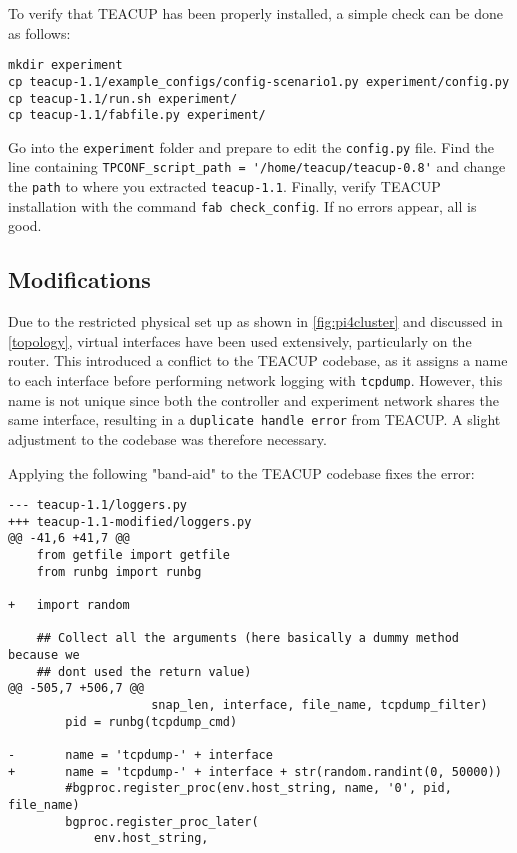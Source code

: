 To verify that TEACUP has been properly installed, a simple check can be done as follows:

\begin{verbatim}
mkdir experiment
cp teacup-1.1/example_configs/config-scenario1.py experiment/config.py
cp teacup-1.1/run.sh experiment/
cp teacup-1.1/fabfile.py experiment/
\end{verbatim}

Go into the \lstinline{experiment} folder and prepare to edit the \lstinline{config.py} file. Find the line containing \lstinline{TPCONF_script_path = '/home/teacup/teacup-0.8'} and change the \lstinline{path} to where you extracted \lstinline{teacup-1.1}. Finally, verify TEACUP installation with the command \lstinline{fab check_config}. If no errors appear, all is good.


\subsection{Modifications}

Due to the restricted physical set up as shown in \ref{fig:pi4cluster} and discussed in \ref{topology}, virtual interfaces have been used extensively, particularly on the router. This introduced a conflict to the TEACUP codebase, as it assigns a name to each interface before performing network logging with \lstinline{tcpdump}. However, this name is not unique since both the controller and experiment network shares the same interface, resulting in a \lstinline{duplicate handle error} from TEACUP. A slight adjustment to the codebase was therefore necessary.

Applying the following "band-aid" to the TEACUP codebase fixes the error:

\begin{verbatim}
--- teacup-1.1/loggers.py
+++ teacup-1.1-modified/loggers.py
@@ -41,6 +41,7 @@
    from getfile import getfile
    from runbg import runbg
    
+   import random
    
    ## Collect all the arguments (here basically a dummy method because we
    ## dont used the return value)
@@ -505,7 +506,7 @@
                    snap_len, interface, file_name, tcpdump_filter)
        pid = runbg(tcpdump_cmd)
    
-       name = 'tcpdump-' + interface
+       name = 'tcpdump-' + interface + str(random.randint(0, 50000))
        #bgproc.register_proc(env.host_string, name, '0', pid, file_name)
        bgproc.register_proc_later(
            env.host_string,
\end{verbatim}

